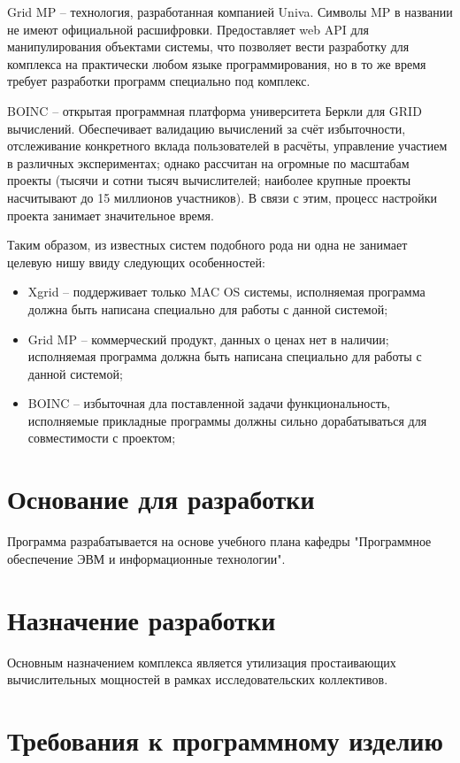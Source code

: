 \documentclass[a4paper,12pt]{report}
\numberwithin{equation}{section}
\begin{document}
Grid MP -- технология, разработанная компанией Univa. Символы MP в названии не имеют официальной расшифровки. 
Предоставляет web API для манипулирования объектами системы, что позволяет вести разработку для комплекса на практически любом языке программирования, но в то же время требует разработки программ специально под комплекс.

BOINC -- открытая программная платформа университета Беркли для GRID вычислений. 
Обеспечивает валидацию вычислений за счёт избыточности, отслеживание конкретного вклада пользователей в расчёты, управление участием в различных экспериментах; однако рассчитан на огромные по масштабам проекты (тысячи и сотни тысяч вычислителей; наиболее крупные проекты насчитывают до 15 миллионов участников). 
В связи с этим, процесс настройки проекта занимает значительное время.

Таким образом, из известных систем подобного рода ни одна не занимает целевую нишу ввиду следующих особенностей: 
\begin{itemize}
  \item Xgrid -- поддерживает только MAC OS системы, исполняемая программа должна быть написана специально для работы с данной системой;
  \item Grid MP -- коммерческий продукт, данных о ценах нет в наличии; исполняемая программа должна быть написана специально для работы с данной системой;
  \item BOINC -- избыточная дла поставленной задачи функциональность, исполняемые прикладные программы должны сильно дорабатываться для совместимости с проектом;
\end{itemize}

\section{Основание для разработки}
Программа разрабатывается на основе учебного плана кафедры "Программное обеспечение ЭВМ и информационные технологии".

\section{Назначение разработки}
Основным назначением комплекса является утилизация простаивающих вычислительных мощностей в рамках исследовательских коллективов.

\section{Требования к программному изделию}
\end{document}
